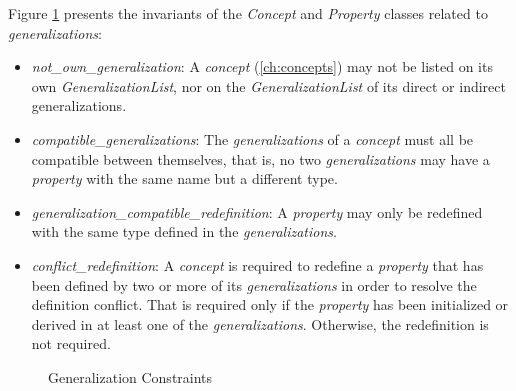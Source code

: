 Figure \ref{fig:ocl:generalization} presents the invariants
of the \emph{Concept} and \emph{Property} classes
related to \emph{generalizations}:

\begin{itemize}

\item \emph{not\_own\_generalization}:
A \emph{concept} (\ref{ch:concepts}) may not be listed on its own \emph{GeneralizationList},
nor on the \emph{GeneralizationList} of its direct or indirect generalizations.

\item \emph{compatible\_generalizations}:
The \emph{generalizations} of a \emph{concept} must all be compatible between themselves,
that is, no two \emph{generalizations} may have a \emph{property} with the same name
but a different type.

\item \emph{generalization\_compatible\_redefinition}:
A \emph{property} may only be redefined with the same type defined in the \emph{generalizations}.

\item \emph{conflict\_redefinition}:
A \emph{concept} is required to redefine a \emph{property} that 
has been defined by two or more of its \emph{generalizations}
in order to resolve the definition conflict.
That is required only if the \emph{property} has been initialized or derived
in at least one of the \emph{generalizations}.
Otherwise, the redefinition is not required.

\end{itemize}

\begin{figure}

\caption{Generalization Constraints}
\label{fig:ocl:generalization}
\end{figure}
